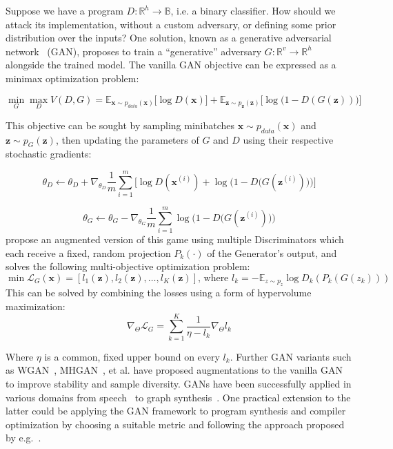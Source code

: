 Suppose we have a program $D: \mathbb{R}^h\rightarrow\mathbb{B}$, i.e. a binary classifier. How should we attack its implementation, without a custom adversary, or defining some prior distribution over the inputs? One solution, known as a generative adversarial network~\citep{goodfellow2014gan} (GAN), proposes to train a ``generative'' adversary $G: \mathbb{R}^v\rightarrow\mathbb{R}^h$ alongside the trained model. The vanilla GAN objective can be expressed as a minimax optimization problem:

\begin{equation}
\min_G \max_D V(D, G) = \mathbb{E}_{\mathbf x \sim p_{data}(\mathbf x)}\big[\log D(\mathbf x)\big] + \mathbb{E}_{\mathbf z \sim p_{\mathbf z}(\mathbf z)}\big[\log\big(1 - D(G(\mathbf z))\big)\big]
\end{equation}

This objective can be sought by sampling minibatches $\mathbf x \sim p_{data}(\mathbf x)$ and $\mathbf z \sim p_{G}(\mathbf z)$, then updating the parameters of $G$ and $D$ using their respective stochastic gradients:

\begin{equation}
\theta_D \leftarrow \theta_D + \nabla_{\theta_D}\frac{1}{m}\sum_{i=1}^m\Big[\log D(\mathbf x^{(i)}) + \log\Big(1 - D\big(G(\mathbf z^{(i)})\big)\Big)\Big]
\end{equation}

\begin{equation}
\theta_G \leftarrow \theta_G - \nabla_{\theta_G}\frac{1}{m}\sum_{i=1}^m \log\Big(1 - D\big(G(\mathbf z^{(i)})\big)\Big)
\end{equation}
%
\citet{albuquerque2019hgan} propose an augmented version of this game using multiple Discriminators which each receive a fixed, random projection $P_k(\cdot)$ of the Generator's output, and solves the following multi-objective optimization problem:
%
\begin{equation} \label{eq:moo_spec}
\min \mathbf{\mathcal{L}}_G(\mathbf x) = \left[l_1(\mathbf z), l_2(\mathbf z), \ldots, l_K(\mathbf z)\right] \text{, where } l_k = -\mathbb E_{z \sim p_z} \log D_k(P_k(G(z_k)))
\end{equation}
%
This can be solved by combining the losses using a form of hypervolume maximization:
%
\begin{equation}
\nabla_\Theta \mathcal{L}_G = \sum_{k=1}^K \frac{1}{\eta - l_k}\nabla_\Theta l_k
\end{equation}

Where $\eta$ is a common, fixed upper bound on every $l_k$. Further GAN variants such as WGAN~\citep{arjovsky2017wgan}, MHGAN~\citep{turner2019mhgan}, et al. have proposed augmentations to the vanilla GAN to improve stability and sample diversity. GANs have been successfully applied in various domains from speech~\citep{donahue2019wavegan} to graph synthesis~\citep{wang2018graphgan}. One practical extension to the latter could be applying the GAN framework to program synthesis and compiler optimization by choosing a suitable metric and following the approach proposed by e.g.~\citet{adams2019learning, mendis2019compiler}.

